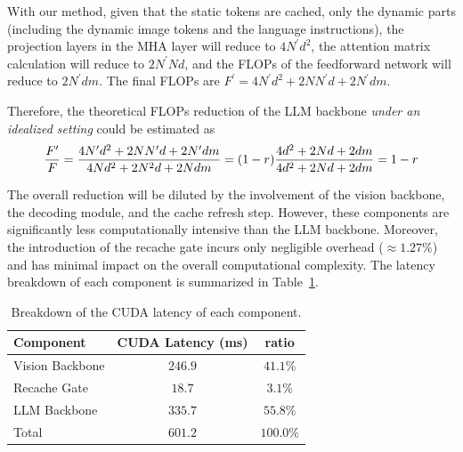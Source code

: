 With our method, given that the static tokens are cached, only the dynamic parts (including the dynamic image tokens and the language instructions), the projection layers in the MHA layer will reduce to $4N^\prime d^2$, the attention matrix calculation will reduce to $2N^\prime Nd$, and the FLOPs of the feedforward network will reduce to $2N^\prime dm$. The final FLOPs are $F^\prime=4N^\prime  d^2 +2 NN^\prime  d + 2N^\prime  dm$.

Therefore, the theoretical FLOPs reduction of the LLM backbone \emph{under an idealized setting} could be estimated as
\begin{equation}
    \frac{F^\prime}{F} = \frac{4N^\prime  d^2 +2 NN^\prime  d + 2N^\prime  dm}{4Nd^2+2N^2d+2Ndm} \\ = (1-r)\frac{4d^2 +2 Nd + 2dm}{4d^2+2Nd+2dm} \\
    =1-r
\end{equation}

The overall reduction will be diluted by the involvement of the vision backbone, the decoding module, and the cache refresh step. However, these components are significantly less computationally intensive than the LLM backbone. Moreover, the introduction of the recache gate incurs only negligible overhead ($\approx 1.27\%$) and has minimal impact on the overall computational complexity. The latency breakdown of each component is summarized in Table~\ref{tab:latency_breakdown}.

\begin{table}[]
    \centering
    \caption{Breakdown of the CUDA latency of each component.}
    \label{tab:latency_breakdown}
    \begin{tabular}{l|cc}
    \toprule
    Component & CUDA Latency (ms) & ratio \\
    \midrule
         Vision Backbone & $246.9$ & $41.1\%$   \\
         Recache Gate & $18.7$ & $3.1\%$ \\
         LLM Backbone & $335.7$ & $55.8\%$ \\
    \midrule 
    Total & $601.2$ & $100.0\%$  \\
    \bottomrule
    \end{tabular}
\end{table}


